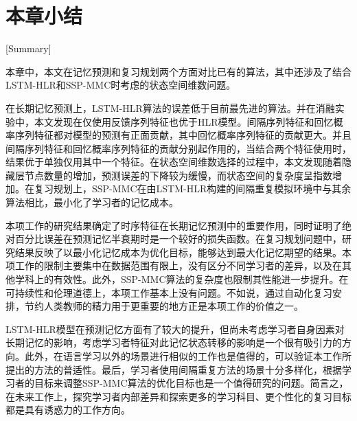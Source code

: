 \section{本章小结}[Summary]

本章中，本文在记忆预测和复习规划两个方面对比已有的算法，其中还涉及了结合LSTM-HLR和SSP-MMC时考虑的状态空间维数问题。

在长期记忆预测上，LSTM-HLR算法的误差低于目前最先进的算法。并在消融实验中，本文发现在仅使用反馈序列特征也优于HLR模型。间隔序列特征和回忆概率序列特征都对模型的预测有正面贡献，其中回忆概率序列特征的贡献更大。并且间隔序列特征和回忆概率序列特征的贡献分别起作用的，当结合两个特征使用时，结果优于单独仅用其中一个特征。在状态空间维数选择的过程中，本文发现随着隐藏层节点数量的增加，预测误差的下降较为缓慢，而状态空间的复杂度呈指数增加。在复习规划上，SSP-MMC在由LSTM-HLR构建的间隔重复模拟环境中与其余算法相比，最小化了学习者的记忆成本。

本项工作的研究结果确定了时序特征在长期记忆预测中的重要作用，同时证明了绝对百分比误差在预测记忆半衰期时是一个较好的损失函数。在复习规划问题中，研究结果反映了以最小化记忆成本为优化目标，能够达到最大化记忆期望的结果。本项工作的限制主要集中在数据范围有限上，没有区分不同学习者的差异，以及在其他学科上的有效性。此外，SSP-MMC算法的复杂度也限制其性能进一步提升。在可持续性和伦理道德上，本项工作基本上没有问题。不如说，通过自动化复习安排，节约人类教师的精力用于更重要的地方正是本项工作的价值之一。

LSTM-HLR模型在预测记忆方面有了较大的提升，但尚未考虑学习者自身因素对长期记忆的影响，考虑学习者特征对此记忆状态转移的影响是一个很有吸引力的方向。此外，在语言学习以外的场景进行相似的工作也是值得的，可以验证本工作所提出的方法的普适性。最后，学习者使用间隔重复方法的场景十分多样化，根据学习者的目标来调整SSP-MMC算法的优化目标也是一个值得研究的问题。简言之，在未来工作上，探究学习者内部差异和探索更多的学习科目、更个性化的复习目标都是具有诱惑力的工作方向。